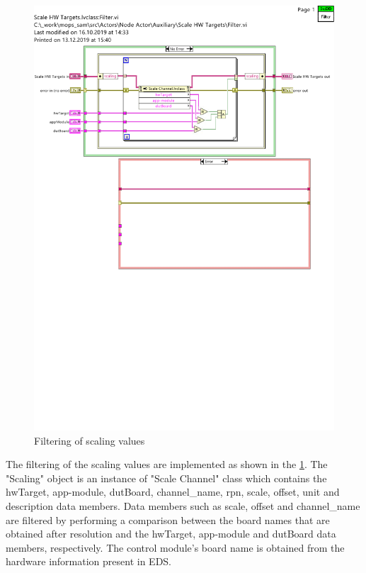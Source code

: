 \begin{figure}[hbt]
		\centering
		\includegraphics[trim=0 540 0 75, clip, width=130mm, scale=0.75]{images/filterVI.pdf}
		\caption{Filtering of scaling values}
		\label{fig:FOS}
\end{figure}

The filtering of the scaling values are implemented as shown in the \cref{fig:FOS}. 
The "Scaling" object is an instance of "Scale Channel" class which contains the hwTarget, app-module, 
dutBoard, channel\_name, rpn, scale, offset, unit and description data members. 
Data members such as scale, offset and channel\_name are filtered by performing a comparison between the board names that are obtained after resolution and the hwTarget, app-module and dutBoard data members, respectively. 
The control module's board name is obtained from the hardware information present in \acrshort{EDS}.   

